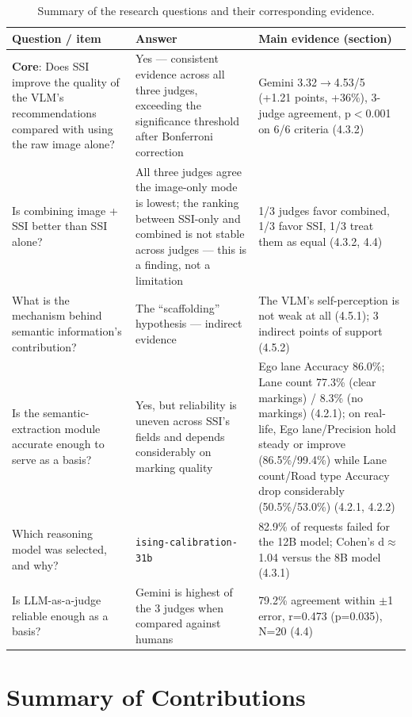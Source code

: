 \documentclass[12pt,a4paper]{report}
\begin{document}
\begin{table}[htbp]
    \centering
    \footnotesize
    \caption{Summary of the research questions and their corresponding evidence.}
    \label{tab:5.1}
    \begin{tabularx}{\linewidth}{@{}p{4.0cm}p{4.6cm}X@{}}
        \toprule
        \textbf{Question / item} & \textbf{Answer} & \textbf{Main evidence (section)} \\
        \midrule
        \textbf{Core}: Does SSI improve the quality of the VLM's recommendations compared with using the raw image alone? & Yes --- consistent evidence across all three judges, exceeding the significance threshold after Bonferroni correction & Gemini 3.32$\to$4.53/5 (+1.21 points, +36\%), 3-judge agreement, p$<$0.001 on 6/6 criteria (4.3.2) \\
        Is combining image + SSI better than SSI alone? & All three judges agree the image-only mode is lowest; the ranking between SSI-only and combined is not stable across judges --- this is a finding, not a limitation & 1/3 judges favor combined, 1/3 favor SSI, 1/3 treat them as equal (4.3.2, 4.4) \\
        What is the mechanism behind semantic information's contribution? & The ``scaffolding'' hypothesis --- indirect evidence & The VLM's self-perception is not weak at all (4.5.1); 3 indirect points of support (4.5.2) \\
        Is the semantic-extraction module accurate enough to serve as a basis? & Yes, but reliability is uneven across SSI's fields and depends considerably on marking quality & Ego lane Accuracy 86.0\%; Lane count 77.3\% (clear markings) / 8.3\% (no markings) (4.2.1); on real-life, Ego lane/Precision hold steady or improve (86.5\%/99.4\%) while Lane count/Road type Accuracy drop considerably (50.5\%/53.0\%) (4.2.1, 4.2.2) \\
        Which reasoning model was selected, and why? & \texttt{ising-calibration-31b} & 82.9\% of requests failed for the 12B model; Cohen's d$\approx$1.04 versus the 8B model (4.3.1) \\
        Is LLM-as-a-judge reliable enough as a basis? & Gemini is highest of the 3 judges when compared against humans & 79.2\% agreement within $\pm$1 error, r=0.473 (p=0.035), N=20 (4.4) \\
        \bottomrule
    \end{tabularx}
\end{table}

\section{Summary of Contributions}
\end{document}
